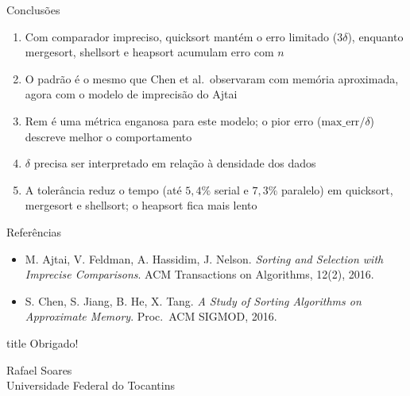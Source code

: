 \documentclass[aspectratio=169,10pt]{beamer}
\begin{document}
\begin{frame}{Conclusões}
  \begin{enumerate}
    \item Com comparador impreciso, \alert{quicksort mantém o erro limitado} ($3\delta$),
          enquanto mergesort, shellsort e heapsort \alert{acumulam} erro com $n$
    \item O padrão é o mesmo que Chen et al.\ observaram com memória aproximada,
          agora com o modelo de imprecisão do Ajtai
    \item Rem é uma métrica enganosa para este modelo; o pior erro
          ($\text{max\_err}/\delta$) descreve melhor o comportamento
    \item $\delta$ precisa ser interpretado em relação à densidade dos dados
    \item A tolerância \alert{reduz o tempo} (até $5{,}4\%$ serial e $7{,}3\%$ paralelo) em
          quicksort, mergesort e shellsort; o heapsort fica mais lento
  \end{enumerate}
\end{frame}

\begin{frame}{Referências}
  \small
  \begin{itemize}
    \item[{[1]}] M. Ajtai, V. Feldman, A. Hassidim, J. Nelson.
      \emph{Sorting and Selection with Imprecise Comparisons}.
      ACM Transactions on Algorithms, 12(2), 2016.
    \item[{[2]}] S. Chen, S. Jiang, B. He, X. Tang.
      \emph{A Study of Sorting Algorithms on Approximate Memory}.
      Proc.\ ACM SIGMOD, 2016.
  \end{itemize}
\end{frame}

\begin{frame}[noframenumbering]{}
  \vfill
  \begin{beamercolorbox}[wd=\textwidth,sep=1em,center]{title}
    {\Huge Obrigado!}
  \end{beamercolorbox}
  \vspace{1em}
  \begin{center}
    Rafael Soares\\[0.3em]
    {\footnotesize Universidade Federal do Tocantins}
  \end{center}
  \vfill
\end{frame}
\end{document}
